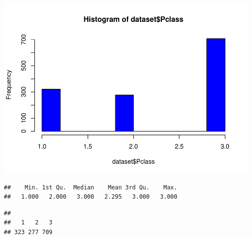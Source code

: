 \documentclass[
]{article}
\newenvironment{Shaded}{\begin{snugshade}}{\end{snugshade}}
\newcommand{\AttributeTok}[1]{\textcolor[rgb]{0.80,0.80,0.80}{#1}}
\newcommand{\CommentTok}[1]{\textcolor[rgb]{0.50,0.62,0.50}{#1}}
\newcommand{\FunctionTok}[1]{\textcolor[rgb]{0.94,0.94,0.56}{#1}}
\newcommand{\NormalTok}[1]{\textcolor[rgb]{0.80,0.80,0.80}{#1}}
\newcommand{\SpecialCharTok}[1]{\textcolor[rgb]{0.86,0.64,0.64}{#1}}
\newcommand{\StringTok}[1]{\textcolor[rgb]{0.80,0.58,0.58}{#1}}
\begin{document}
\includegraphics{titanic-analysis_files/figure-latex/unnamed-chunk-14-2.pdf}

\begin{Shaded}
\end{Shaded}

\begin{verbatim}
##    Min. 1st Qu.  Median    Mean 3rd Qu.    Max. 
##   1.000   2.000   3.000   2.295   3.000   3.000
\end{verbatim}

\begin{Shaded}
\end{Shaded}

\begin{verbatim}
## 
##   1   2   3 
## 323 277 709
\end{verbatim}

\begin{Shaded}
\end{Shaded}
\end{document}
